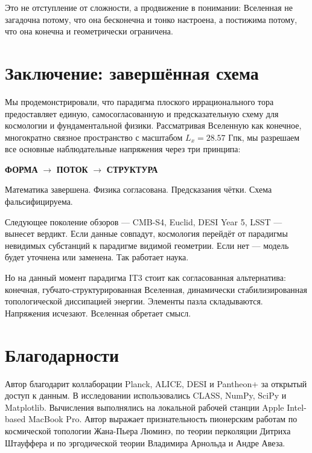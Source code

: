\documentclass[12pt,a4paper]{article}
\begin{document}
Это не отступление от сложности, а продвижение в понимании: Вселенная не загадочна потому, что она бесконечна и тонко настроена, а постижима потому, что она конечна и геометрически ограничена.

\section{Заключение: завершённая схема}

Мы продемонстрировали, что парадигма плоского иррационального тора предоставляет единую, самосогласованную и предсказательную схему для космологии и фундаментальной физики. Рассматривая Вселенную как конечное, многократно связное пространство с масштабом $L_x = 28.57$ Гпк, мы разрешаем все основные наблюдательные напряжения через три принципа:

\begin{center}
\textbf{ФОРМА} $\rightarrow$ \textbf{ПОТОК} $\rightarrow$ \textbf{СТРУКТУРА}
\end{center}

Математика завершена. Физика согласована. Предсказания чётки. Схема фальсифицируема.

Следующее поколение обзоров — CMB-S4, Euclid, DESI Year 5, LSST — вынесет вердикт. Если данные совпадут, космология перейдёт от парадигмы невидимых субстанций к парадигме видимой геометрии. Если нет — модель будет уточнена или заменена. Так работает наука.

Но на данный момент парадигма IT3 стоит как согласованная альтернатива: конечная, губчато-структурированная Вселенная, динамически стабилизированная топологической диссипацией энергии. Элементы пазла складываются. Напряжения исчезают. Вселенная обретает смысл.

\section*{Благодарности}

Автор благодарит коллаборации Planck, ALICE, DESI и Pantheon+ за открытый доступ к данным. В исследовании использовались CLASS, NumPy, SciPy и Matplotlib. Вычисления выполнялись на локальной рабочей станции Apple Intel-based MacBook Pro. Автор выражает признательность пионерским работам по космической топологии Жана-Пьера Люминэ, по теории перколяции Дитриха Штауффера и по эргодической теории Владимира Арнольда и Андре Авеза.
\end{document}
